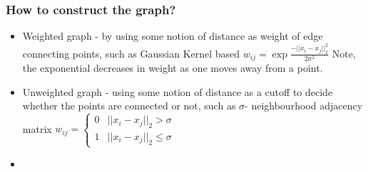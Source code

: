 \documentclass{article}
\begin{document}
\subsubsection{How to construct the graph?}
\begin{itemize}
    \item Weighted graph - by using some notion of distance as weight of edge connecting points, such as Gaussian Kernel based $w_{ij} = \exp{\frac{-||x_i-x_j||_2^2}{2\sigma^2}}$
    Note, the exponential decreases in weight as one moves away from a point.
    \item Unweighted graph - using some notion of distance as a cutoff to decide whether the points are connected or not, such as $\sigma$- neighbourhood adjacency matrix $w_{ij} = \begin{cases} 0 & ||x_i-x_j||_2 > \sigma \\ 1 & ||x_i-x_j||_2 \leq \sigma \end{cases}$
    \item {}
\end{itemize}
\end{document}
